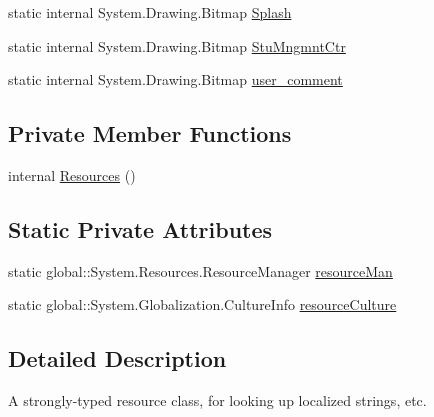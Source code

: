 \begin{DoxyCompactItemize}
\item 
static internal \*
\-System.\-Drawing.\-Bitmap \hyperlink{class_sr_p___classroom_inq_1_1_properties_1_1_resources_a75b49c74ef8386ce82d421d246095e89}{\-Splash}
\item 
static internal \*
\-System.\-Drawing.\-Bitmap \hyperlink{class_sr_p___classroom_inq_1_1_properties_1_1_resources_a8936df34fac714793207e165f0e1abb3}{\-Stu\-Mngmnt\-Ctr}
\item 
static internal \*
\-System.\-Drawing.\-Bitmap \hyperlink{class_sr_p___classroom_inq_1_1_properties_1_1_resources_a640888878348ec44e2974837abb13f97}{user\-\_\-comment}
\end{DoxyCompactItemize}
\subsection*{\-Private \-Member \-Functions}
\begin{DoxyCompactItemize}
\item 
internal \hyperlink{class_sr_p___classroom_inq_1_1_properties_1_1_resources_a91297eac0bdbe155069e733d94d051bc}{\-Resources} ()
\end{DoxyCompactItemize}
\subsection*{\-Static \-Private \-Attributes}
\begin{DoxyCompactItemize}
\item 
static \*
global\-::\-System.\-Resources.\-Resource\-Manager \hyperlink{class_sr_p___classroom_inq_1_1_properties_1_1_resources_ae22dad3e6078a39a90778bb00e89e1c6}{resource\-Man}
\item 
static \*
global\-::\-System.\-Globalization.\-Culture\-Info \hyperlink{class_sr_p___classroom_inq_1_1_properties_1_1_resources_a022040216319d6d3cdc26fe2af7fdc7a}{resource\-Culture}
\end{DoxyCompactItemize}


\subsection{\-Detailed \-Description}
\-A strongly-\/typed resource class, for looking up localized strings, etc. 



